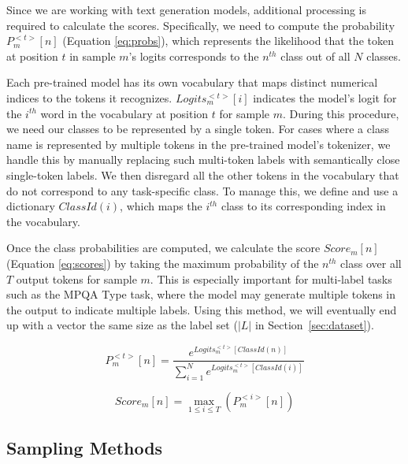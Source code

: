 \documentclass[11pt]{article}
\theoremstyle{definition}
\begin{document}
Since we are working with text generation models, additional processing is required to calculate the scores. Specifically, we need to compute the probability $P_{m}^{<t>}[n]$ (Equation \ref{eq:probs}), which represents the likelihood that the token at position $t$ in sample $m$'s logits corresponds to the $n^{th}$ class out of all $N$ classes.

Each pre-trained model has its own vocabulary that maps distinct numerical indices to the tokens it recognizes. 
$Logits_{m}^{<t>}[i]$ indicates the model's logit for the $i^{th}$ word in the vocabulary at position $t$ for sample $m$. During this procedure, we need our classes to be represented by a single token.
For cases where a class name is represented by multiple tokens in the pre-trained model's tokenizer, we handle this by manually replacing such multi-token labels with semantically close single-token labels. We then disregard all the other tokens in the vocabulary that do not correspond to any task-specific class. To manage this, we define and use a dictionary $ClassId(i)$, which maps the $i^{th}$ class to its corresponding index in the vocabulary.

Once the class probabilities are computed, we calculate the score $Score_m [n]$ (Equation \ref{eq:scores}) by taking the maximum probability of the $n^{th}$ class over all $T$ output tokens for sample $m$. This is especially important for multi-label tasks such as the MPQA Type task, where the model may generate multiple tokens in the output to indicate multiple labels.
Using this method, we will eventually end up with a vector the same size as the label set ($|L|$ in Section~\ref{sec:dataset}).

\begin{equation} \label{eq:probs}
    P_{m}^{<t>}[n] = \frac{
        e^{Logits_{m}^{<t>}[ClassId(n)]}
    }{
        \sum_{i=1}^{N} e^{Logits_{m}^{<t>}[ClassId(i)]}
    }
\end{equation}

\vspace{-1em}

\begin{equation} \label{eq:scores}
    Score_{m} [n] = \max_{1 \le i \le T} (P_{m}^{<i>}[n])
\end{equation}


\subsection{Sampling Methods} \label{sec:sampling_methods}
\end{document}
